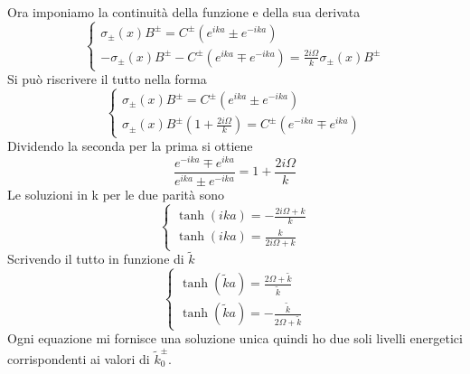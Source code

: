 \documentclass[a4paper]{article}
\begin{document}
        Ora imponiamo la continuità della funzione e della sua derivata 
        \begin{equation*}
            \begin{cases}
                \sigma_\pm(x)B^\pm=C^\pm \left(e^{ika}\pm e^{-ika}\right)\\
                -\sigma_\pm(x)B^\pm-C^\pm \left(e^{ika}\mp e^{-ika}\right)=\frac{2i\Omega}{k}\sigma_\pm(x)B^\pm
            \end{cases}
        \end{equation*}
        Si può riscrivere il tutto nella forma
        \begin{equation*}
            \begin{cases}
                \sigma_\pm(x)B^\pm=C^\pm \left(e^{ika}\pm e^{-ika}\right)\\
                \sigma_\pm(x)B^\pm\left(1+\frac{2i\Omega}{k}\right)=C^\pm \left(e^{-ika}\mp e^{ika}\right)
            \end{cases}
        \end{equation*}
        Dividendo la seconda per la prima si ottiene
        \begin{equation*}
            \frac{e^{-ika}\mp e^{ika}}{e^{ika}\pm e^{-ika}}=1+\frac{2i\Omega}{k}
        \end{equation*}
        Le soluzioni in k per le due parità sono
        \begin{equation*}
            \begin{cases}
                \tanh(ika)=-\frac{2i\Omega+k}{k}\\
                \tanh(ika)=\frac{k}{2i\Omega+k}
            \end{cases}
        \end{equation*}
        Scrivendo il tutto in funzione di $\tilde{k}$
        \begin{equation*}
            \begin{cases}
                \tanh(\tilde{k}a)=\frac{2\Omega+\tilde{k}}{\tilde{k}}\\
                \tanh(\tilde{k}a)=-\frac{\tilde{k}}{2\Omega+\tilde{k}}
            \end{cases}
        \end{equation*}
        Ogni equazione mi fornisce una soluzione unica quindi ho due soli livelli energetici corrispondenti ai valori di $\tilde{k}^\pm_0$.
\end{document}
